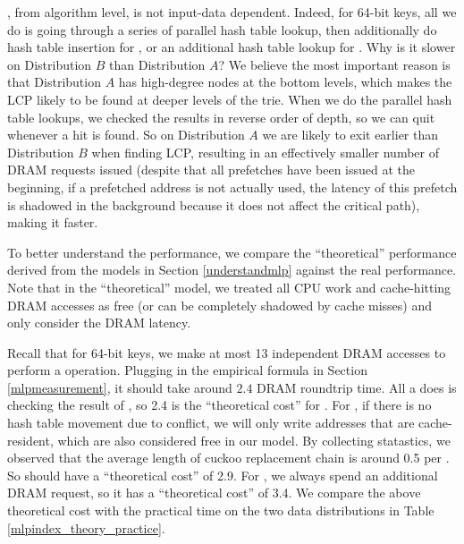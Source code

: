 \documentclass[11pt, usletter]{article}
\begin{document}
\MlpIndex, from algorithm level, is not input-data dependent. 
Indeed, for 64-bit keys, all we do is going through a series of parallel hash table lookup, 
then additionally do hash table insertion for \insertion, or an additional hash table lookup for \lowerbound. 
Why is it slower on Distribution $B$ than Distribution $A$? 
We believe the most important reason is that Distribution $A$ has high-degree nodes at the bottom levels, 
which makes the LCP likely to be found at deeper levels of the trie. 
When we do the parallel hash table lookups, we checked the results in reverse order of depth, 
so we can quit whenever a hit is found. 
So on Distribution $A$ we are likely to exit earlier than Distribution $B$ when finding LCP, 
resulting in an effectively smaller number of DRAM requests issued 
(despite that all prefetches have been issued at the beginning, if a prefetched address is not actually used, 
the latency of this prefetch is shadowed in the background because it does not affect the critical path), 
making it faster.

To better understand the performance, 
we compare the ``theoretical'' performance derived from the models in Section \ref{understandmlp} against the real performance. 
Note that in the ``theoretical'' model, 
we treated all CPU work and cache-hitting DRAM accesses as free (or can be completely shadowed by cache misses) 
and only consider the DRAM latency.

Recall that for 64-bit keys, we make at most 13 independent DRAM accesses to perform a \QueryLCP operation. 
Plugging in the empirical formula in Section \ref{mlpmeasurement}, it should take around $2.4$ DRAM roundtrip time.
All a \lookup does is checking the result of \QueryLCP, so 2.4 is the ``theoretical cost'' for \lookup. 
For \insertion, if there is no hash table movement due to conflict, we will only write addresses that are cache-resident, 
which are also considered free in our model. 
By collecting statastics, we observed that the average length of cuckoo replacement chain is around 0.5 per \insertion. 
So \insertion should have a ``theoretical cost'' of 2.9.
For \lowerbound, we always spend an additional DRAM request, 
so it has a ``theoretical cost'' of 3.4. We compare the above theoretical cost with the practical time 
on the two data distributions in Table \ref{mlpindex_theory_practice}.
\end{document}
